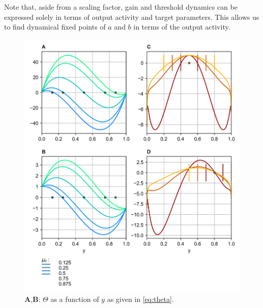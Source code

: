 \documentclass[10pt,a4paper]{article}
\begin{document}
Note that, aside from a scaling factor, gain and threshold dynamics can be expressed solely in terms of output activity and target parameters. This allows us to find dynamical fixed points of $a$ and $b$ in terms of the output activity.

\begin{figure}
\centering
\includegraphics[width=\textwidth]{./figures/gain_thresh_dyn.png}
\caption{\textbf{A},\textbf{B}: $\Theta$ as a function of $y$ as given in \eqref{eq:theta}. }
\end{figure}

\section{}
\end{document}
